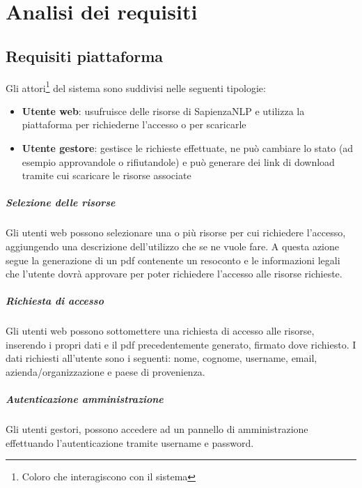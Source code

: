 
\chapter{Analisi dei requisiti}


\section{Requisiti piattaforma}
Gli attori\footnote{Coloro che interagiscono con il sistema} del sistema
sono suddivisi nelle seguenti tipologie:
\begin{itemize}
	\item \textbf{Utente web}: usufruisce delle risorse di SapienzaNLP e utilizza
	la piattaforma per richiederne l'accesso o per scaricarle
	\item \textbf{Utente gestore}: gestisce le richieste effettuate, ne
	può cambiare lo stato (ad esempio approvandole o rifiutandole) e può generare
	dei link di download tramite cui scaricare le risorse associate
\end{itemize}

\paragraph{Selezione delle risorse}
Gli utenti web possono selezionare una o più risorse per cui richiedere l'accesso,
aggiungendo una descrizione dell'utilizzo che se ne vuole fare. A questa azione
segue la generazione di un pdf contenente un resoconto e le informazioni legali
che l'utente dovrà approvare per poter richiedere l'accesso alle risorse richieste.

\paragraph{Richiesta di accesso} \label{par:access-request}
Gli utenti web possono sottomettere una richiesta di accesso alle risorse, inserendo
i propri dati e il pdf precedentemente generato, firmato dove richiesto.
I dati richiesti all'utente sono i seguenti: nome, cognome, username, email,
azienda/organizzazione e paese di provenienza.

\paragraph{Autenticazione amministrazione}
Gli utenti gestori, possono accedere ad un pannello di amministrazione
effettuando l'autenticazione tramite username e password.

